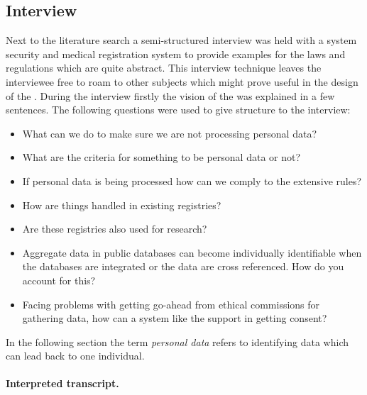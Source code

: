 \subsection{Interview}
\label{security-interviews}




Next to the literature search a semi-structured interview was held with a system security and medical registration system  to provide examples for the laws and regulations which are quite abstract.
This interview technique leaves the interviewee free to roam to other subjects which might prove useful in the design of the \ivfsystem{}.
During the interview firstly the vision of the \ivfsystem{} was explained in a few sentences.
The following questions were used to give structure to the interview:

\begin{itemize}
  \item What can we do to make sure we are not processing personal data?
  \item What are the criteria for something to be personal data or not?
  \item If personal data is being processed how can we comply to the extensive rules?
  \item How are things handled in existing registries?
  \item Are these registries also used for research?
  \item Aggregate data in public databases can become individually identifiable when the databases are integrated or the data are cross referenced. 
  How do you account for this?
  \item Facing problems with getting go-ahead from ethical commissions for gathering data, how can a system like the \ivfsystem{} support in getting consent?
\end{itemize}

In the following section the term \emph{personal data} refers to identifying data which can lead back to one individual.


\paragraph{Interpreted transcript.}
\label{security-interview-transcript}


